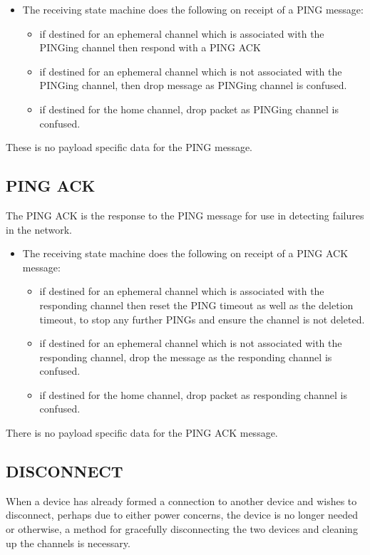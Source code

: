 \begin{itemize}
	\item []The receiving state machine does the following on receipt of a PING message:
	\begin{itemize}
		\item if destined for an ephemeral channel which is associated with the PINGing channel then respond with a PING ACK
		\item if destined for an ephemeral channel which is not associated with the PINGing channel, then drop message as PINGing channel is confused.
		\item if destined for the home channel, drop packet as PINGing channel is confused.
	\end{itemize}
\end{itemize}

These is no payload specific data for the PING message.

\subsection{PING ACK} %
\label{sub:ping_ack}
The PING ACK is the response to the PING message for use in detecting failures in the network.

\begin{itemize}
	\item []The receiving state machine does the following on receipt of a PING ACK message:
	\begin{itemize}
		\item if destined for an ephemeral channel which is associated with the responding channel then reset the PING timeout as well as the deletion timeout, to stop any further PINGs and ensure the channel is not deleted. 
		\item if destined for an ephemeral channel which is not associated with the responding channel, drop the message as the responding channel is confused.
		\item if destined for the home channel, drop packet as responding channel is confused.
	\end{itemize}
\end{itemize}

There is no payload specific data for the PING ACK message.

\subsection{DISCONNECT} %
\label{sub:disconnect}
When a device has already formed a connection to another device and wishes to disconnect, perhaps due to either power concerns, the device is no longer needed or otherwise, a method for gracefully disconnecting the two devices and cleaning up the channels is necessary.

